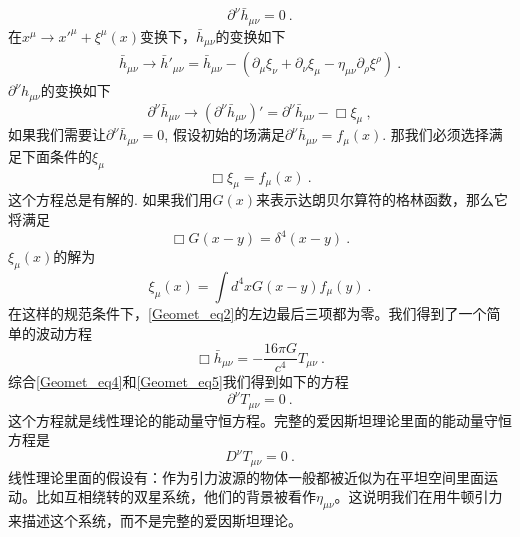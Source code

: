 \begin{equation}\label{Geomet_eq4}
\partial^\nu \bar h_{\mu\nu} = 0 ~. 
\end{equation}
在$x^\mu\rightarrow x'^\mu+\xi^\mu(x)$变换下，$\bar h_{\mu\nu}$的变换如下
\begin{align}
\bar h_{\mu\nu} \rightarrow \bar h'_{\mu\nu} = \bar h_{\mu\nu} - (\partial_\mu\xi_\nu+ \partial_\nu\xi_\mu - \eta_{\mu\nu} \partial_\rho\xi^\rho )~. 
\end{align}
$\partial^\nu h_{\mu\nu}$的变换如下
\begin{equation}
\partial^\nu \bar h_{\mu\nu} \rightarrow (\partial^\nu \bar h_{\mu\nu})' = \partial^\nu \bar h_{\mu\nu} - \Box \xi_\mu ~, 
\end{equation}
如果我们需要让$\partial^\nu \bar h_{\mu\nu} = 0$, 假设初始的场满足$\partial^\nu \bar h_{\mu\nu} = f_\mu (x)$. 那我们必须选择满足下面条件的$\xi_\mu$
\begin{equation}
\Box \xi_\mu = f_\mu (x) ~. 
\end{equation}
这个方程总是有解的. 如果我们用$G(x)$来表示达朗贝尔算符的格林函数，那么它将满足
\begin{equation}
\Box G(x-y) = \delta^4 (x-y) ~.
\end{equation}
$\xi_\mu(x)$的解为
\begin{equation}
\xi_\mu(x) = \int d^4 x G(x-y) f_\mu(y) ~.
\end{equation}
在这样的规范条件下，\autoref{Geomet_eq2}的左边最后三项都为零。我们得到了一个简单的波动方程
\begin{equation}\label{Geomet_eq3}
\Box \bar h_{\mu\nu} = - \frac{16\pi G}{c^4} T_{\mu\nu} ~. 
\end{equation}
综合\autoref{Geomet_eq4}和\autoref{Geomet_eq5}我们得到如下的方程
\begin{equation}
\partial^\nu T_{\mu\nu} = 0~.
\end{equation}
这个方程就是线性理论的能动量守恒方程。完整的爱因斯坦理论里面的能动量守恒方程是
\begin{equation}
D^\nu T_{\mu\nu} = 0 ~.
\end{equation}
线性理论里面的假设有：作为引力波源的物体一般都被近似为在平坦空间里面运动。比如互相绕转的双星系统，他们的背景被看作$\eta_{\mu\nu}$。这说明我们在用牛顿引力来描述这个系统，而不是完整的爱因斯坦理论。















